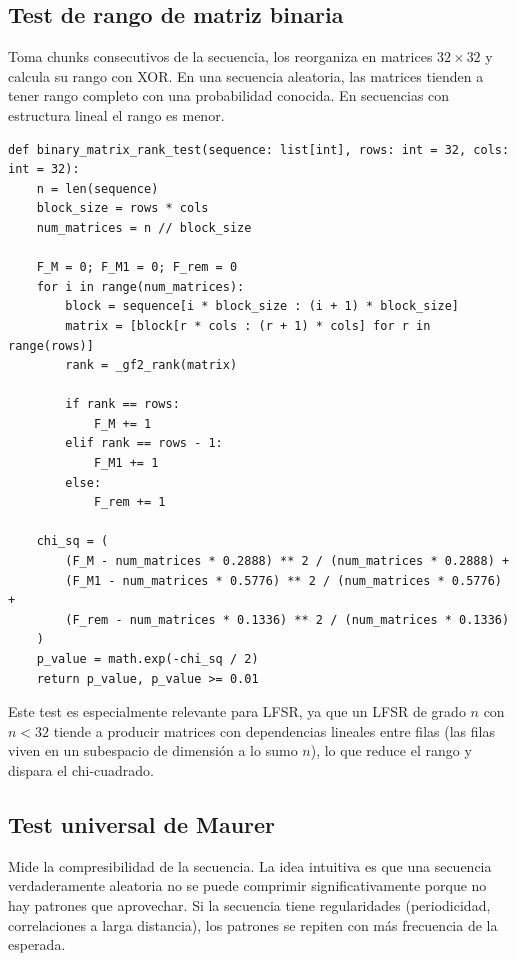 \subsection{Test de rango de matriz binaria}

Toma chunks consecutivos de la secuencia, los reorganiza en matrices $32 \times 32$ y calcula su rango con XOR.
En una secuencia aleatoria, las matrices tienden a tener rango completo con una probabilidad conocida.
En secuencias con estructura lineal el rango es menor.

\begin{lstlisting}[style=Python,caption={Test Binary Matrix Rank (extracto de \texttt{src/tests\_nist/binary\_matrix.py}).}]
def binary_matrix_rank_test(sequence: list[int], rows: int = 32, cols: int = 32):
    n = len(sequence)
    block_size = rows * cols
    num_matrices = n // block_size

    F_M = 0; F_M1 = 0; F_rem = 0
    for i in range(num_matrices):
        block = sequence[i * block_size : (i + 1) * block_size]
        matrix = [block[r * cols : (r + 1) * cols] for r in range(rows)]
        rank = _gf2_rank(matrix)

        if rank == rows:
            F_M += 1
        elif rank == rows - 1:
            F_M1 += 1
        else:
            F_rem += 1

    chi_sq = (
        (F_M - num_matrices * 0.2888) ** 2 / (num_matrices * 0.2888) +
        (F_M1 - num_matrices * 0.5776) ** 2 / (num_matrices * 0.5776) +
        (F_rem - num_matrices * 0.1336) ** 2 / (num_matrices * 0.1336)
    )
    p_value = math.exp(-chi_sq / 2)
    return p_value, p_value >= 0.01
\end{lstlisting}

Este test es especialmente relevante para LFSR, ya que un LFSR de grado $n$ con $n < 32$ tiende a producir matrices con dependencias lineales entre filas
(las filas viven en un subespacio de dimensión a lo sumo $n$), lo que reduce el rango y dispara el chi-cuadrado.

\subsection{Test universal de Maurer}

Mide la compresibilidad de la secuencia. La idea intuitiva es que una secuencia verdaderamente aleatoria no se puede comprimir significativamente porque no hay patrones que aprovechar.
Si la secuencia tiene regularidades (periodicidad, correlaciones a larga distancia), los patrones se repiten con más frecuencia de la esperada.

